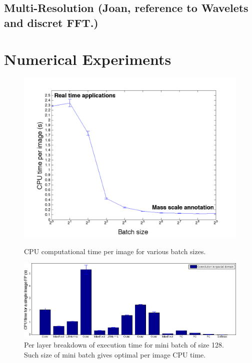 \documentclass{article}
\begin{document}
\subsection{Multi-Resolution (Joan, reference to Wavelets and discret FFT.)}


\section{Numerical Experiments}

\begin{figure}[h]
  \begin{minipage}[b]{0.48\linewidth}
  	\includegraphics[width=\textwidth]{img/eval_per_batch.png}
  	\caption{CPU computational time per image for various batch sizes.}
  \end{minipage}
  \hspace{2mm}
  \begin{minipage}[b]{0.48\linewidth}
  	\includegraphics[width=\textwidth]{img/eval_per_layer_per_batch_128_batch_size.png}
  	\caption{Per layer breakdown of execution time for mini batch of size 128. Such size of mini batch gives optimal per image CPU time.}

\end{minipage}
\end{figure}
\end{document}
